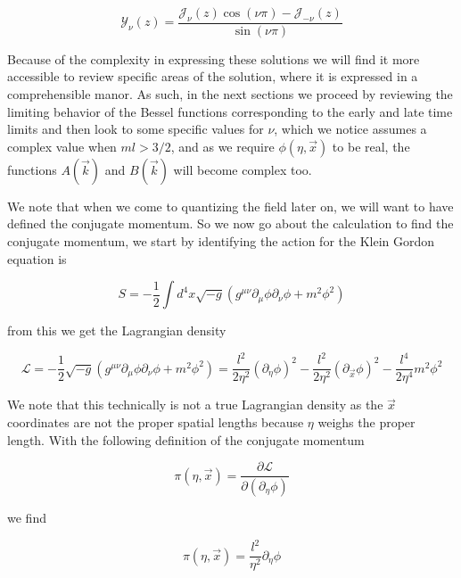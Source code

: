\documentclass[a4paper,11pt]{article}
\numberwithin{equation}{section}
\numberwithin{figure}{section}
\begin{document}
\begin{large}
\vspace{0.5cm}

\begin{equation}
\label{Y(z)}    
    \mathcal{Y}_\nu(z)=\frac{\mathcal{J}_\nu(z)\cos(\nu\pi)-\mathcal{J}_{-\nu}(z)}{\sin(\nu\pi)}
\end{equation}

\vspace{0.5cm}

Because of the complexity in expressing these solutions we will find it more accessible to review specific areas of the solution, where it is expressed in a comprehensible manor. As such, in the next sections we proceed by reviewing the limiting behavior of the Bessel functions corresponding to the early and late time limits and then look to some specific values for $\nu$, which we notice assumes a complex value when $ml>3/2$, and as  we require $\phi(\eta,\Vec{x})$ to be real, the functions $A(\Vec{k})$ and $B(\Vec{k})$ will become complex too.

We note that when we come to quantizing the field later on, we will want  to have defined the conjugate momentum. So we now go about the calculation to find the conjugate momentum, we start by identifying the action for the Klein Gordon equation is 

\begin{equation}
\label{KGaction}    
    S=-\frac{1}{2}\int d^4x\sqrt{-g}(g^{\mu\nu}\partial_\mu\phi\partial_\nu\phi+m^2\phi^2) 
\end{equation}

from this we get the Lagrangian density

\begin{equation}
\label{Ldensity}    
    \mathcal{L}=-\frac{1}{2}\sqrt{-g}(g^{\mu\nu}\partial_\mu\phi\partial_\nu\phi+m^2\phi^2)=\frac{l^2}{2\eta^2} (\partial_\eta\phi)^2-\frac{l^2}{2\eta^2}(\partial_{\Vec{x}}\phi)^2-\frac{l^4}{2\eta^4}m^2\phi^2
\end{equation}

We note that this technically is not a true Lagrangian density as the $\Vec{x}$ coordinates are not the proper spatial lengths because $\eta$ weighs the proper length. With the following definition of the conjugate momentum 

$$\pi(\eta,\Vec{x})=\frac{\partial\mathcal{L}}{\partial(\partial_\eta\phi)}$$

we find 

\begin{equation}
\label{conjmom}    
    \pi(\eta,\Vec{x})=\frac{l^2}{\eta^2}\partial_\eta\phi
\end{equation}


\end{large}
\end{document}
